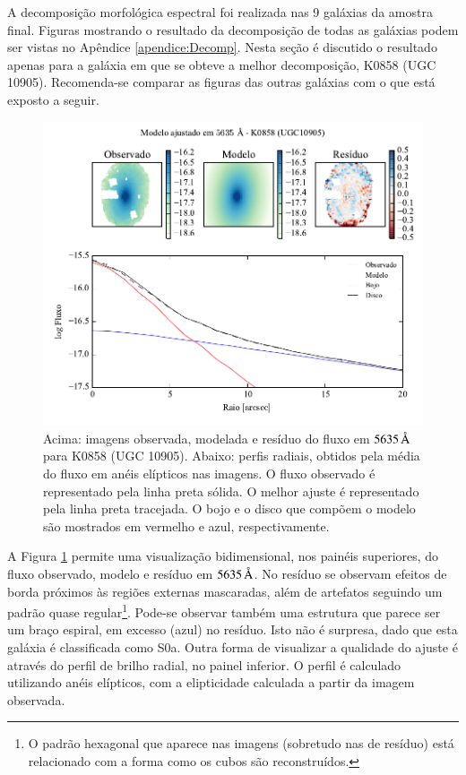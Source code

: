 A decomposição morfológica espectral foi realizada nas 9 galáxias da amostra
final. Figuras mostrando o resultado da decomposição de todas as galáxias podem
ser vistas no Apêndice \ref{apendice:Decomp}. Nesta seção é discutido o
resultado apenas para a galáxia em que se obteve a melhor decomposição, K0858
(UGC 10905). Recomenda-se comparar as figuras das outras galáxias com o que está
exposto a seguir.

\begin{figure}
	\includegraphics[page=1]{figuras-decomp/K0858_sample006a}
	\caption[Ajuste morfológico em $5635\,\angstrom$ para K0858 (UGC 10905)]
	{Acima: imagens observada, modelada e resíduo do fluxo em $5635\,\angstrom$
	para K0858 (UGC 10905). Abaixo: perfis radiais, obtidos pela média do fluxo em
	anéis elípticos nas imagens. O fluxo observado é representado pela linha preta
	sólida. O melhor ajuste é representado pela linha preta tracejada. O bojo e o
	disco que compõem o modelo são mostrados em vermelho e azul, respectivamente.}
	\label{fig:decompRadprof}
\end{figure}

A Figura \ref{fig:decompRadprof} permite uma visualização bidimensional, nos
painéis superiores, do fluxo observado, modelo e resíduo em $5635\,\angstrom$.
No resíduo se observam efeitos de borda próximos às regiões externas mascaradas,
além de artefatos seguindo um padrão quase regular\footnote{O padrão hexagonal
que aparece nas imagens (sobretudo nas de resíduo) está relacionado com a forma
como os cubos são reconstruídos.}. Pode-se observar também uma estrutura que
parece ser um braço espiral, em excesso (azul) no resíduo. Isto não é surpresa,
dado que esta galáxia é classificada como S0a. Outra forma de visualizar a
qualidade do ajuste é através do perfil de brilho radial, no painel inferior. O
perfil é calculado utilizando anéis elípticos, com a elipticidade calculada a
partir da imagem observada.

